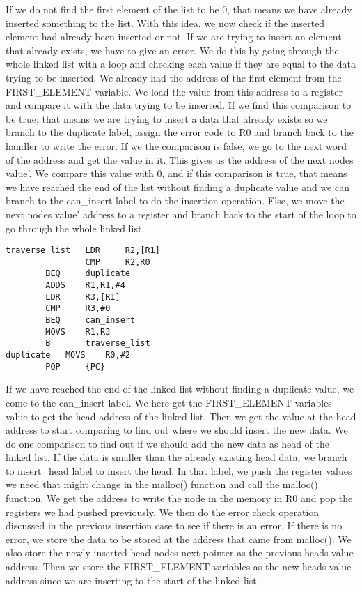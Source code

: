 \documentclass[pdftex,12pt,a4paper]{article}
\begin{document}
If we do not find the first element of the list to be 0, that means we have already inserted something to the list. With this idea, we now check if the inserted element had already been inserted or not. If we are trying to insert an element that already exists, we have to give an error. We do this by going through the whole linked list with a loop and checking each value if they are equal to the data trying to be inserted. We already had the address of the first element from the FIRST\_ELEMENT variable. We load the value from this address to a register and compare it with the data trying to be inserted. If we find this comparison to be true; that means we are trying to insert a data that already exists so we branch to the duplicate label, assign the error code to R0 and branch back to the handler to write the error. If we the comparison is false, we go to the next word of the address and get the value in it. This gives us the address of the next nodes value'. We compare this value with 0, and if this comparison is true, that means we have reached the end of the list without finding a duplicate value and we can branch to the can\_insert label to do the insertion operation. Else, we move the next nodes value' address to a register and branch back to the start of the loop to go through the whole linked list.

\begin{lstlisting}
traverse_list   LDR     R2,[R1] 				
    	        CMP     R2,R0						
		BEQ     duplicate				
		ADDS    R1,R1,#4				
		LDR     R3,[R1]						
		CMP     R3,#0					
		BEQ     can_insert					
		MOVS    R1,R3					
		B       traverse_list	
duplicate	MOVS    R0,#2					
		POP     {PC}
\end{lstlisting}



If we have reached the end of the linked list without finding a duplicate value, we come to the can\_insert label. We here get the FIRST\_ELEMENT variables value to get the head address of the linked list. Then we get the value at the head address to start comparing to find out where we should insert the new data. We do one comparison to find out if we should add the new data as head of the linked list. If the data is smaller than the already existing head data, we branch to insert\_head label to insert the head. In that label, we push the register values we need that might change in the malloc() function and call the malloc() function. We get the address to write the node in the memory in R0 and pop the registers we had pushed previously. We then do the error check operation discussed in the previous insertion case to see if there is an error. If there is no error, we store the data to be stored at the address that came from malloc(). We also store the newly inserted head nodes next pointer as the previous heads value address. Then we store the FIRST\_ELEMENT variables as the new heads value address since we are inserting to the start of the linked list.
\end{document}
